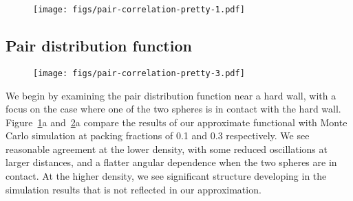 \documentclass[letterpaper,twocolumn,amsmath,amssymb,pre,aps,10pt]{revtex4-1}
\begin{document}
\begin{figure}
  \texttt{[image: figs/pair-correlation-pretty-1.pdf]}
  \caption{ 
  }\label{fig:pair-distribution-1}
\end{figure}

\subsection{Pair distribution function}

\begin{figure}
  \texttt{[image: figs/pair-correlation-pretty-3.pdf]}
  \caption{}\label{fig:pair-distribution-3}
\end{figure}

We begin by examining the pair distribution function near a hard wall,
with a focus on the case where one of the two spheres is in contact
with the hard wall.  Figure~\ref{fig:pair-distribution-1}a
and~\ref{fig:pair-distribution-3}a compare the results of our
approximate functional with Monte Carlo simulation at packing
fractions of 0.1 and 0.3 respectively.  We see reasonable agreement at
the lower density, with some reduced oscillations at larger distances,
and a flatter angular dependence when the two spheres are in contact.
At the higher density, we see significant structure developing in the
simulation results that is not reflected in our approximation.
\end{document}
